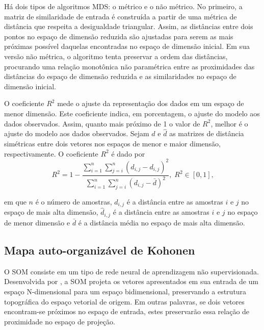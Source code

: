 Há dois tipos de algoritmos \ac{MDS}: o métrico e o não métrico. No primeiro, a matriz de similaridade de entrada é construída a partir de uma métrica de distância que respeita a desigualdade triangular. Assim, as distâncias entre dois pontos no espaço de dimensão reduzida são ajustadas para serem as mais próximas possível daquelas encontradas no espaço de dimensão inicial. Em sua versão não métrica, o algoritmo tenta preservar a ordem das distâncias, procurando uma relação monotônica não paramétrica entre as proximidades das distâncias do espaço de dimensão reduzida e as similaridades no espaço de dimensão inicial.

O coeficiente $R^2$ mede o ajuste da representação dos dados em um espaço de menor dimensão. Este coeficiente indica, em porcentagem, o ajuste do modelo aos dados observados. Assim, quanto mais próximo de 1 o valor de $R^2$, melhor é o ajuste do modelo aos dados observados.  Sejam $d$ e $\hat{d}$ as matrizes de distância simétricas entre dois vetores nos espaços de menor e maior dimensão, respectivamente. O coeficiente $R^2$ é dado por 
\begin{equation}
R^2= 1-\frac{\sum_{i=1}^n \sum_{j = i}^{n}(\hat{d}_{i,j} - d_{i,j})^2}{\sum_{i=1}^n\sum_{j=i}^n (d_{i,j}-\bar{d})^2}
\text{,}\:\: R^2 \in [0,1]\text{,}
\end{equation}

\noindent em que  $n$ é o número de amostras, $d_{i,j}$ é a distância entre as amostras $i$ e $j$ no espaço de mais alta dimensão, $\hat{d}_{i,j}$ é a distância entre as amostras $i$ e $j$ no espaço de menor dimensão e $\bar{d}$  é a distância média no espaço de mais alta dimensão.



\subsection{Mapa auto-organizável de Kohonen}

O \acf{SOM} \cite{Kohonen:2001} consiste em um tipo de rede neural de aprendizagem não supervisionada. Desenvolvida por , a \ac{SOM} projeta os vetores apresentados em sua entrada de um espaço N-dimensional para um espaço bidimensional, preservando a estrutura topográfica do espaço vetorial de origem. Em outras palavras, se dois vetores encontram-se próximos no espaço de entrada, estes preservarão essa relação de proximidade no espaço de projeção. 

\begin{comment}
Em seu processo de treinamento, a rede \emph{SOM} agrupa os vetores de entrada através de um processo de aprendizado competitivo mantendo a estrutura topológica do espaço vetorial de entrada.
\end{comment}

